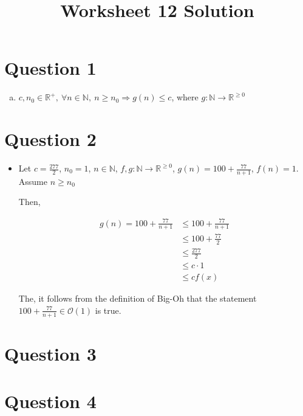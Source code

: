 \documentclass[12pt]{article}
\begin{document}
\title{Worksheet 12 Solution}
\maketitle

\section*{Question 1}
\begin{enumerate}[a.]
    \item

    $c,n_0 \in \mathbb{R}^{+},\:\forall n \in \mathbb{N},\: n \geq n_0 \Rightarrow
    g(n) \leq c$, where $g: \mathbb{N} \to \mathbb{R}^{\geq 0}$
\end{enumerate}

\section*{Question 2}
\begin{itemize}
    \item

    Let $c = \frac{277}{2}$, $n_0 = 1$, $n \in \mathbb{N}$, $f,g: \mathbb{N} \to
    \mathbb{R}^{\geq 0}$, $g(n) = 100 + \frac{77}{n+1}$, $f(n) = 1$. Assume $n \geq n_0$

    \bigskip

    Then,

    \begin{align}
        g(n) = 100 + \frac{77}{n+1} &\leq 100 + \frac{77}{n+1}\\
        &\leq 100 + \frac{77}{2}\\
        &\leq \frac{277}{2}\\
        &\leq c \cdot 1\\
        &\leq c f(x)
    \end{align}

    \bigskip

    The, it follows from the definition of Big-Oh that the statement $100 +
    \frac{77}{n+1} \in \mathcal{O}(1)$ is true.

\end{itemize}

\section*{Question 3}

\section*{Question 4}
\end{document}
